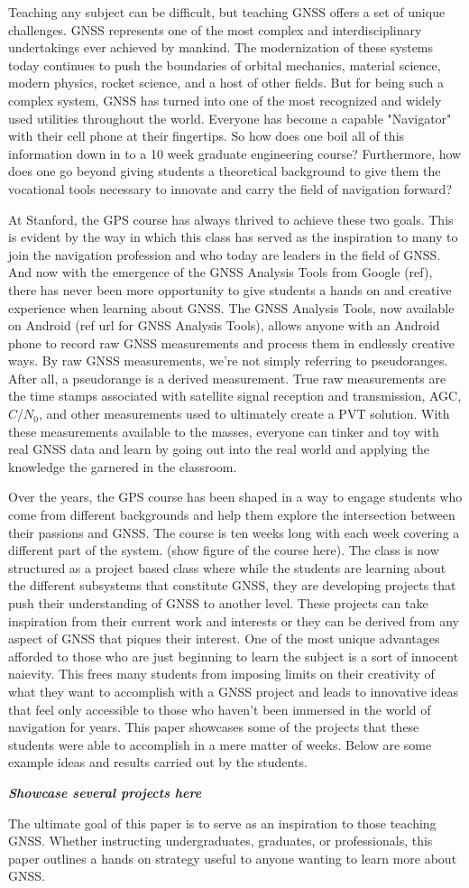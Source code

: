 \documentclass[12pt, conference, onecolumn, draftclsnofoot]{IEEEtran}
\begin{document}
Teaching any subject can be difficult, but teaching GNSS offers a set of unique challenges.
GNSS represents one of the most complex and interdisciplinary undertakings ever achieved by mankind.
The modernization of these systems today continues to push the boundaries of orbital mechanics, material science, modern physics, rocket science, and a host of other fields.
But for being such a complex system, GNSS has turned into one of the most recognized and widely used utilities throughout the world.
Everyone has become a capable "Navigator" with their cell phone at their fingertips.
So how does one boil all of this information down in to a 10 week graduate engineering course?
Furthermore, how does one go beyond giving students a theoretical background to give them the vocational tools necessary to innovate and carry the field of navigation forward?

At Stanford, the GPS course has always thrived to achieve these two goals.
This is evident by the way in which this class has served as the inspiration to many to join the navigation profession and who today are leaders in the field of GNSS.
And now with the emergence of the GNSS Analysis Tools from Google (ref), there has never been more opportunity to give students a hands on and creative experience when learning about GNSS.
The GNSS Analysis Tools, now available on Android (ref url for GNSS Analysis Tools), allows anyone with an Android phone to record raw GNSS measurements and process them in endlessly creative ways.
By raw GNSS measurements, we're not simply referring to pseudoranges.
After all, a pseudorange is a derived measurement.
True raw measurements are the time stamps associated with satellite signal reception and transmission, AGC, $C$/$N_0$, and other measurements used to ultimately create a PVT solution.
With these measurements available to the masses, everyone can tinker and toy with real GNSS data and learn by going out into the real world and applying the knowledge the garnered in the classroom.

Over the years, the GPS course has been shaped in a way to engage students who come from different backgrounds and help them explore the intersection between their passions and GNSS.
The course is ten weeks long with each week covering a different part of the system. (show figure of the course here).
The class is now structured as a project based class where while the students are learning about the different subsystems that constitute GNSS, they are developing projects that push their understanding of GNSS to another level.
These projects can take inspiration from their current work and interests or they can be derived from any aspect of GNSS that piques their interest.
One of the most unique advantages afforded to those who are just beginning to learn the subject is a sort of innocent naievity.
This frees many students from imposing limits on their creativity of what they want to accomplish with a GNSS project and leads to innovative ideas that feel only accessible to those who haven't been immersed in the world of navigation for years. 
This paper showcases some of the projects that these students were able to accomplish in a mere matter of weeks.
Below are some example ideas and results carried out by the students.

\textit{\textbf{Showcase several projects here}}

The ultimate goal of this paper is to serve as an inspiration to those teaching GNSS.
Whether instructing undergraduates, graduates, or professionals, this paper outlines a hands on strategy useful to anyone wanting to learn more about GNSS.
\end{document}

